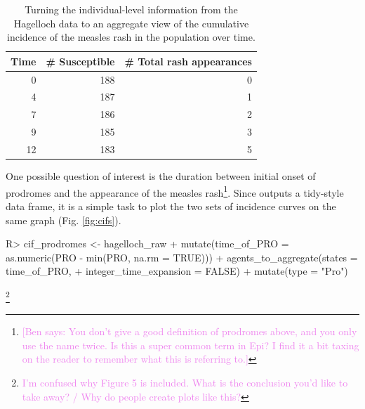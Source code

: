 \documentclass[
  shortnames]{jss}
\begin{document}
\begin{CodeChunk}
\begin{table}[!h]

\caption{\label{tab:cif-rash}Turning the individual-level information from the Hagelloch data to an aggregate view of the cumulative incidence of the measles rash in the population over time.}
\centering
\begin{tabular}[t]{rrr}
\toprule
Time & \# Susceptible & \# Total rash appearances\\
\midrule
0 & 188 & 0\\
4 & 187 & 1\\
7 & 186 & 2\\
9 & 185 & 3\\
12 & 183 & 5\\
\bottomrule
\end{tabular}
\end{table}

\end{CodeChunk}

One possible question of interest is the duration between initial onset
of prodromes and the appearance of the measles
rash\footnote{\textcolor{violet}{[Ben says: You don't give a good definition of prodromes above, and you only use the name twice. Is this a super common term in Epi? I find it a bit taxing on the reader to remember what this is referring to.]}}.
Since  outputs a tidy-style data frame, it
is a simple task to plot the two sets of incidence curves on the same
graph (Fig. \ref{fig:cifs}).

\begin{CodeChunk}
\begin{CodeInput}
R> cif_prodromes <- hagelloch_raw %
+   mutate(time_of_PRO = as.numeric(PRO - min(PRO, na.rm = TRUE))) %
+   agents_to_aggregate(states = time_of_PRO,
+                       integer_time_expansion = FALSE) %
+   mutate(type = "Pro")
\end{CodeInput}
\end{CodeChunk}

\footnote{\textcolor{violet}{I'm confused why Figure 5 is included. What is the conclusion you'd like to take away? / Why do people create plots like this?}}
\end{document}
